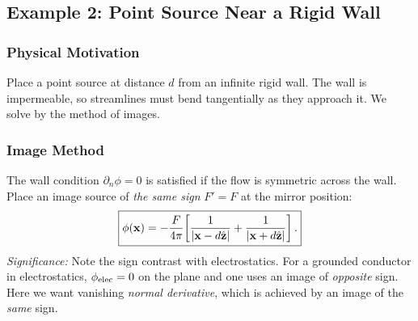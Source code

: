 \documentclass[../main.tex]{subfiles}
\begin{document}
\subsection{Example 2: Point Source Near a Rigid Wall}\label{sec:lec15:source_wall}

\subsubsection*{Physical Motivation}
Place a point source at distance $d$ from an infinite rigid wall. The wall is impermeable, so streamlines must bend tangentially as they approach it. We solve by the method of images.

\begin{center}
\end{center}

\subsubsection{Image Method}

The wall condition $\partial_n\phi=0$ is satisfied if the flow is symmetric across the wall. Place an image source of \emph{the same sign} $F'=F$ at the mirror position:
\begin{equation}
  \boxed{\phi(\mathbf{x}) = -\frac{F}{4\pi}\!\left[\frac{1}{|\mathbf{x} - d\hat{\mathbf{z}}|} + \frac{1}{|\mathbf{x} + d\hat{\mathbf{z}}|}\right].}
  \label{eq:lec15_phi_image}
\end{equation}
\textit{Significance:} Note the sign contrast with electrostatics. For a grounded conductor in electrostatics, $\phi_{\rm elec}=0$ on the plane and one uses an image of \emph{opposite} sign. Here we want vanishing \emph{normal derivative}, which is achieved by an image of the \emph{same} sign.
\end{document}
